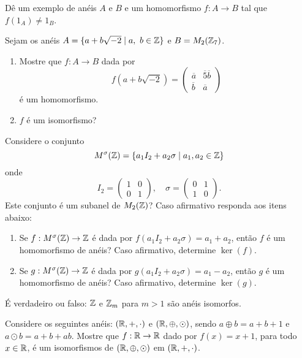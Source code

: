 \documentclass[12pt]{exam}
\begin{document}
\vspace{.3cm}

\questao{} Dê um exemplo de anéis $A$ e $B$ e um homomorfismo $f : A \to B$ tal que $f(1_A) \ne 1_B$.

\vspace{.3cm}

\questao{} Sejam os anéis $A = \{ a + b\sqrt{-2} \mid a,\ b \in \mathbb{Z}\}$ e $B = M_2(\mathbb{Z}_7)$.
\begin{enumerate}[label=({\alph*})]
    \item Mostre que $f : A \to B$ dada por
    \[
        f(a + b\sqrt{-2}) =
        \begin{pmatrix}
            \overline{a} & \overline{5}\overline{b}\\
            \overline{b} & \overline{a}
        \end{pmatrix}
    \]
    é um homomorfismo.

    \item $f$ é um isomorfismo?
\end{enumerate}

\vspace{.3cm}

\questao{} Considere o conjunto
\[
    M^\sigma(\mathbb{Z}) = \{a_1I_2 + a_2\sigma \mid a_1, a_2 \in \mathbb{Z}\}
\]
onde
\[
    I_2 = \begin{pmatrix} 1 & 0\\ 0 & 1\end{pmatrix}, \quad \sigma = \begin{pmatrix} 0 & 1\\ 1 & 0\end{pmatrix}.
\]
Este conjunto é um subanel de $M_2(\mathbb{Z})$? Caso afirmativo responda aos itens abaixo:
\begin{enumerate}[label=({\alph*})]
    \item Se $f : M^\sigma(\mathbb{Z}) \to \mathbb{Z}$ é dada por $f(a_1I_2 + a_2\sigma) = a_1 + a_2$, então $f$ é um homomorfismo de anéis? Caso afirmativo, determine $\ker(f)$.

    \item Se $g : M^\sigma(\mathbb{Z}) \to \mathbb{Z}$ é dada por $g(a_1I_2 + a_2\sigma) = a_1 - a_2$, então $g$ é um homomorfismo de anéis? Caso afirmativo, determine $\ker(g)$.
\end{enumerate}

\vspace{.3cm}

\questao{} É verdadeiro ou falso: $\mathbb{Z}$ e $\mathbb{Z}_{m}$ para $m > 1$ são anéis
isomorfos.

\vspace{.3cm}

\questao{} Considere os seguintes anéis: $(\mathbb{R}, +, \cdot)$ e $(\mathbb{R}, \oplus, \odot)$, sendo $a \oplus b = a + b + 1$ e $a \odot b = a + b + ab$. Mostre que $f : \mathbb{R} \to \mathbb{R}$ dado por $f(x) = x + 1$, para todo $x \in \mathbb{R}$, é um isomorfismos de $(\mathbb{R}, \oplus, \odot)$ em $(\mathbb{R}, +, \cdot)$.

\vspace{.3cm}
\end{document}
